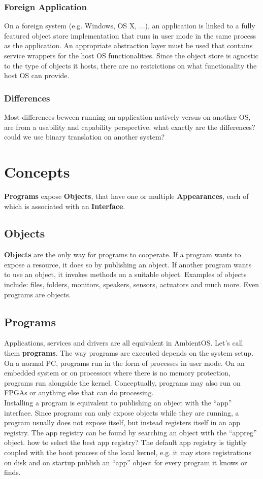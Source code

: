 \documentclass[a4paper]{article}
\begin{document}
\subsubsection{Foreign Application}
On a foreign system (e.g. Windows, OS X, ...), an application is linked to a fully featured object store implementation that runs in user mode in the same process as the application. An appropriate abstraction layer must be used that contains service wrappers for the host OS functionalities. Since the object store is agnostic to the type of objects it hosts, there are no restrictions on what functionality the host OS can provide.

\subsubsection{Differences}
Most differences beween running an application natively versus on another OS, are from a usability and capability perspective. {\q what exactly are the differences? could we use binary translation on another system?}


\section{Concepts}
{\bf Programs} expose {\bf Objects}, that have one or multiple {\bf Appearances}, each of which is associated with an {\bf Interface}.

\subsection{Objects}
{\bf Objects} are the only way for programs to cooperate.
If a program wants to expose a resource, it does so by publishing an object. If another program wants to use an object, it invokes methods on a suitable object.
Examples of objects include: files, folders, monitors, speakers, sensors, actuators and much more. Even programs are objects.

\subsection{Programs}
Applications, services and drivers are all equivalent in AmbientOS. Let's call them {\bf programs}. The way programs are executed depends on the system setup. On a normal PC, programs run in the form of processes in user mode. On an embedded system or on processors where there is no memory protection, programs run alongside the kernel. Conceptually, programs may also run on FPGAs or anything else that can do processing. \\
Installing a program is equivalent to publishing an object with the ``app'' interface. Since programs can only expose objects while they are running, a program usually does not expose itself, but instead registers itself in an app registry. The app registry can be found by searching an object with the ``appreg'' object. {\q how to select the best app registry?} The default app registry is tightly coupled with the boot process of the local kernel, e.g. it may store registrations on disk and on startup publish an ``app'' object for every program it knows or finds.
\end{document}
